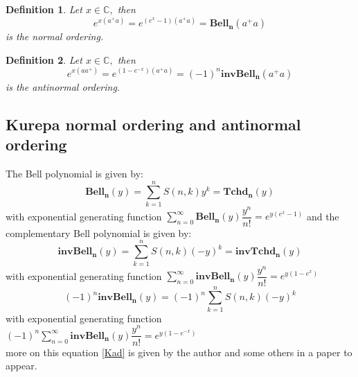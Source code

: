 \documentclass[pdflatex,sn-mathphys-num]{sn-jnl}%
\newtheorem{definition}{Definition}
\theoremstyle{thmstyleone}%
\theoremstyle{thmstyletwo}%
\theoremstyle{thmstylethree}%
\newcommand{\BC}{\mathbb{C}}
\begin{document}
\begin{definition}\label{odt}\cite{osti_4389568, mansour2016commutation}
    Let $x\in \BC,$ then $$e^{x(a^{\mathbb{+}}a)}= e^{(e^x -1)(a^{\mathbb{+}}a)}= \mathbf{Bell_n}(a^{\mathbb{+}}a)$$ is the normal ordering.
\end{definition}

\begin{definition}\label{anti}\cite{mehta2009sudarshan, PhysRevLett.18.752, osti_4310789}
    Let $x\in \BC,$ then $$e^{x(aa^{\mathbb{+}})}= e^{(1-e^{-x})(a^{\mathbb{+}}a)}= (-1)^n\mathbf{invBell_n}(a^{\mathbb{+}}a)$$ is the antinormal ordering.
\end{definition}



\subsection{Kurepa normal ordering and antinormal ordering}
The Bell polynomial is given by:
\[
\mathbf{Bell_n}(y) =\sum_{k=1}^{n} S(n, k) y^k=\mathbf{Tchd_n}(y)
\]
with exponential generating function $\sum_{n=0}^{\infty}\mathbf{Bell_n}(y)\dfrac{y^n}{n!}=e^{y(e^x - 1)}$
and the complementary Bell polynomial is given by:
\[
\mathbf{invBell_n}(y) =\sum_{k=1}^{n} S(n, k) (-y)^k=\mathbf{invTchd_n}(y)
\]
with exponential generating function $\sum_{n=0}^{\infty}\mathbf{invBell_n}(y)\dfrac{y^n}{n!}=e^{y(1-e^x)}$
\begin{equation}\label{Kad}
    (-1)^n\mathbf{invBell_n}(y) =(-1)^n\sum_{k=1}^{n} S(n, k) (-y)^k
\end{equation}
with exponential generating function $(-1)^n\sum_{n=0}^{\infty}\mathbf{invBell_n}(y)\dfrac{y^n}{n!}=e^{y(1-e^{-x})}$\\
more on this equation \ref{Kad} is given by the author and some others in a paper to appear.\\
\end{document}
